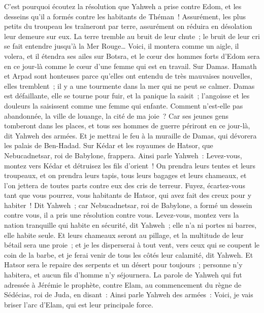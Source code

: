 \begin{multicols}{2}
C'est pourquoi écoutez la résolution que Yahweh a prise contre Edom, et les desseins qu'il a formés contre les habitants de Théman~! Assurément, les plus petits du troupeau les traîneront par terre, assurément on réduira en désolation leur demeure sur eux.
La terre tremble au bruit de leur chute~; le bruit de leur cri se fait entendre jusqu'à la Mer Rouge…
Voici, il montera comme un aigle, il volera, et il étendra ses ailes sur Botsra, et le cœur des hommes forts d'Edom sera en ce jour-là comme le cœur d'une femme qui est en travail.
Sur Damas. Hamath et Arpad sont honteuses parce qu'elles ont entendu de très mauvaises nouvelles, elles tremblent~; il y a une tourmente dans la mer qui ne peut se calmer.
Damas est défaillante, elle se tourne pour fuir, et la panique la saisit~; l'angoisse et les douleurs la saisissent comme une femme qui enfante.
Comment n'est-elle pas abandonnée, la ville de louange, la cité de ma joie~?
Car ses jeunes gens tomberont dans les places, et tous ses hommes de guerre périront en ce jour-là, dit Yahweh des armées.
Et je mettrai le feu à la muraille de Damas, qui dévorera les palais de Ben-Hadad.
Sur Kédar et les royaumes de Hatsor, que Nebucadnetsar, roi de Babylone, frappera. Ainsi parle Yahweh~: Levez-vous, montez vers Kédar et détruisez les fils d'orient~!
On prendra leurs tentes et leurs troupeaux, et on prendra leurs tapis, tous leurs bagages et leurs chameaux, et l'on jettera de toutes parts contre eux des cris de terreur.
Fuyez, écartez-vous tant que vous pourrez, vous habitants de Hatsor, qui avez fait des creux pour y habiter~! Dit Yahweh~; car Nebucadnetsar, roi de Babylone, a formé un dessein contre vous, il a pris une résolution contre vous.
Levez-vous, montez vers la nation tranquille qui habite en sécurité, dit Yahweh~; elle n'a ni portes ni barres, elle habite seule.
Et leurs chameaux seront au pillage, et la multitude de leur bétail sera une proie~; et je les disperserai à tout vent, vers ceux qui se coupent le coin de la barbe, et je ferai venir de tous les côtés leur calamité, dit Yahweh.
Et Hatsor sera le repaire des serpents et un désert pour toujours~; personne n'y habitera, et aucun fils d'homme n'y séjournera.
La parole de Yahweh qui fut adressée à Jérémie le prophète, contre Elam, au commencement du règne de Sédécias, roi de Juda, en disant~:
Ainsi parle Yahweh des armées~: Voici, je vais briser l'arc d'Elam, qui est leur principale force.

\end{multicols}
